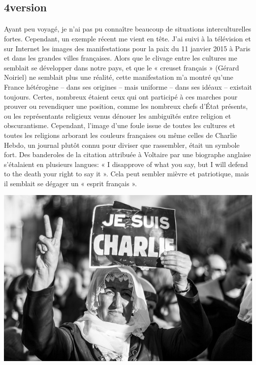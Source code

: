 \subsection{4\ieme version}

\paragraph{} Ayant peu voyagé, je n'ai pas pu connaître beaucoup de situations
interculturelles fortes. Cependant, un exemple récent me vient en tête. J'ai
suivi à la télévision et sur Internet les images des manifestations pour la
paix du 11 janvier 2015 à Paris et dans les grandes villes françaises. Alors
que le clivage entre les cultures me semblait se développer dans notre pays, et
que le « creuset français » (Gérard Noiriel) ne semblait plus une réalité,
cette manifestation m'a montré qu'une France hétérogène – dans ses origines –
mais uniforme – dans ses idéaux – existait toujours. Certes, nombreux étaient
ceux qui ont participé à ces marches pour prouver ou revendiquer une position,
comme les nombreux chefs d'État présents, ou les représentants religieux venus
dénouer les ambiguïtés entre religion et obscurantisme. Cependant, l'image
d'une foule issue de toutes les cultures et toutes les religions arborant les
couleurs françaises ou même celles de Charlie Hebdo, un journal plutôt connu
pour diviser que rassembler, était un symbole fort. Des banderoles de la
citation attribuée à Voltaire par une biographe anglaise s'étalaient en
plusieurs langues: « I disapprove of what you say, but I will defend to the
death your right to say it ». Cela peut sembler mièvre et patriotique, mais il
semblait se dégager un « esprit français ».

\begin{center}
	\includegraphics[scale=0.5]{charlie.jpg}
\end{center}

